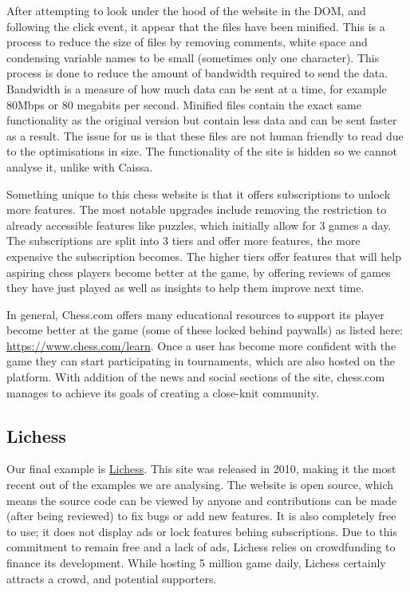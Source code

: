 After attempting to look under the hood of the website in the DOM, and following the click event, it appear that the files have been minified. This is a process to reduce the size of files by removing comments, white space and condensing variable names to be small (sometimes only one character). This process is done to reduce the amount of bandwidth required to send the data. Bandwidth is a measure of how much data can be sent at a time, for example 80Mbps or 80 megabits per second. Minified files contain the exact same functionality as the original version but contain less data and can be sent faster as a result. The issue for us is that these files are not human friendly to read due to the optimisations in size. The functionality of the site is hidden so we cannot analyse it, unlike with Caissa.

\cite{Chess.comTiers} Something unique to this chess website is that it offers subscriptions to unlock more features. The most notable upgrades include removing the restriction to already accessible features like puzzles, which initially allow for 3 games a day. The subscriptions are split into 3 tiers and offer more features, the more expensive the subscription becomes. The higher tiers offer features that will help aspiring chess players become better at the game, by offering reviews of games they have just played as well as insights to help them improve next time.

In general, Chess.com offers many educational resources to support its player become better at the game (some of these locked behind paywalls) as listed here: \url{https://www.chess.com/learn}. Once a user has become more confident with the game they can start participating in tournaments, which are also hosted on the platform. With addition of the news and social sections of the site, chess.com manages to achieve its goals \cite{Chess.com} of creating a close-knit community.

\subsection{Lichess}

\cite{Lichess} Our final example is \href{https://lichess.org}{Lichess}. This site was released in 2010, making it the most recent out of the examples we are analysing. The website is open source, which means the source code can be viewed by anyone and contributions can be made (after being reviewed) to fix bugs or add new features. It is also completely free to use; it does not display ads or lock features behing subscriptions. Due to this commitment to remain free and a lack of ads, Lichess relies on crowdfunding to finance its development. While hosting 5 million game daily, Lichess certainly attracts a crowd, and potential supporters.

